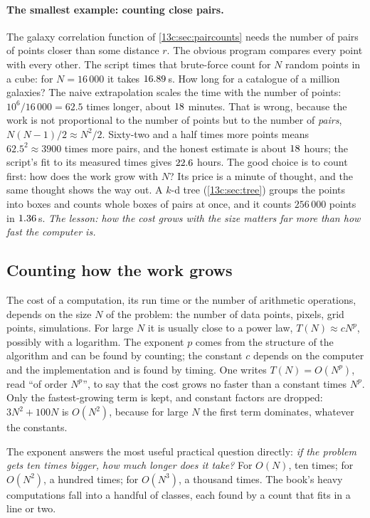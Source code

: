 \paragraph{The smallest example: counting close pairs.} The galaxy correlation function of \cref{13c:sec:paircounts} needs the number of pairs of points closer than some distance $r$. The obvious program compares every point with every other. The script  times that brute-force count for $N$ random points in a cube: for $N=16\,000$ it takes $16.89$\,s. How long for a catalogue of a million galaxies? The naive extrapolation scales the time with the number of points: $10^6/16\,000=62.5$ times longer, about $\TzBruteLinMin$ minutes. That is wrong, because the work is not proportional to the number of points but to the number of \emph{pairs}, $N(N-1)/2\approx N^2/2$. Sixty-two and a half times more points means $62.5^2\approx3900$ times more pairs, and the honest estimate is about $\TzBruteQuadH$ hours; the script's fit to its measured times gives $22.6$ hours. The good choice is to count first: how does the work grow with $N$? Its price is a minute of thought, and the same thought shows the way out. A $k$-d tree (\cref{13c:sec:tree}) groups the points into boxes and counts whole boxes of pairs at once, and it counts $256\,000$ points in $1.36$\,s. \emph{The lesson: how the cost grows with the size matters far more than how fast the computer is.}

\subsection{Counting how the work grows}
\label{T0a:sec:bigO}

The cost of a computation, its run time or the number of arithmetic operations, depends on the size $N$ of the problem: the number of data points, pixels, grid points, simulations. For large $N$ it is usually close to a power law, $T(N)\approx cN^p$, possibly with a logarithm. The exponent $p$ comes from the structure of the algorithm and can be found by counting; the constant $c$ depends on the computer and the implementation and is found by timing. One writes $T(N)=O(N^p)$, read ``of order $N^p$'', to say that the cost grows no faster than a constant times $N^p$. Only the fastest-growing term is kept, and constant factors are dropped: $3N^2+100N$ is $O(N^2)$, because for large $N$ the first term dominates, whatever the constants.

The exponent answers the most useful practical question directly: \emph{if the problem gets ten times bigger, how much longer does it take?} For $O(N)$, ten times; for $O(N^2)$, a hundred times; for $O(N^3)$, a thousand times. The book's heavy computations fall into a handful of classes, each found by a count that fits in a line or two.

